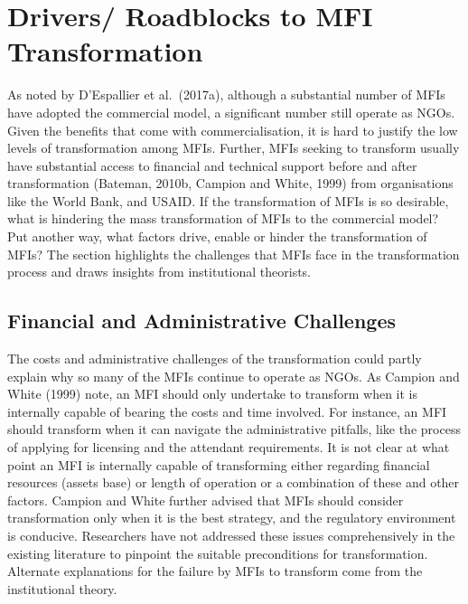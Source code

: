 \documentclass[a4paper, nobind]{templates/ociamthesis}
\begin{document}
\hypertarget{drivers-roadblocks-to-mfi-transformation}{%
\section{Drivers/ Roadblocks to MFI Transformation}\label{drivers-roadblocks-to-mfi-transformation}}

\noindent As noted by D'Espallier et al.~(2017a), although a substantial number of MFIs have adopted the commercial model, a significant number still operate as NGOs. Given the benefits that come with commercialisation, it is hard to justify the low levels of transformation among MFIs. Further, MFIs seeking to transform usually have substantial access to financial and technical support before and after transformation (Bateman, 2010b, Campion and White, 1999) from organisations like the World Bank, and USAID. If the transformation of MFIs is so desirable, what is hindering the mass transformation of MFIs to the commercial model? Put another way, what factors drive, enable or hinder the transformation of MFIs? The section highlights the challenges that MFIs face in the transformation process and draws insights from institutional theorists.

\hypertarget{financial-and-administrative-challenges}{%
\subsection{Financial and Administrative Challenges}\label{financial-and-administrative-challenges}}

\noindent The costs and administrative challenges of the transformation could partly explain why so many of the MFIs continue to operate as NGOs. As Campion and White (1999) note, an MFI should only undertake to transform when it is internally capable of bearing the costs and time involved. For instance, an MFI should transform when it can navigate the administrative pitfalls, like the process of applying for licensing and the attendant requirements. It is not clear at what point an MFI is internally capable of transforming either regarding financial resources (assets base) or length of operation or a combination of these and other factors. Campion and White further advised that MFIs should consider transformation only when it is the best strategy, and the regulatory environment is conducive. Researchers have not addressed these issues comprehensively in the existing literature to pinpoint the suitable preconditions for transformation. Alternate explanations for the failure by MFIs to transform come from the institutional theory.
\end{document}
